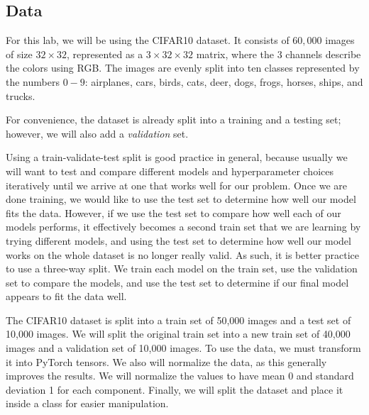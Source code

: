 \subsection*{Data}
For this lab, we will be using the CIFAR10 dataset.
It consists of $60,000$ images of size $32\times32$, represented as a $3\times 32\times 32$ matrix, where the 3 channels describe the colors using RGB.
The images are evenly split into ten classes represented by the numbers $0-9$:  airplanes, cars, birds, cats, deer, dogs, frogs, horses, ships, and trucks.

For convenience, the dataset is already split into a training and a testing set; however, we will also add a \emph{validation} set.

Using a train-validate-test split is good practice in general, because usually we will want to test and compare different models and hyperparameter choices iteratively until we arrive at one that works well for our problem.
Once we are done training, we would like to use the test set to determine how well our model fits the data.
However, if we use the test set to compare how well each of our models performs, it effectively becomes a second train set that we are learning by trying different models, and using the test set to determine how well our model works on the whole dataset is no longer really valid.
As such, it is better practice to use a three-way split.
We train each model on the train set, use the validation set to compare the models, and use the test set to determine if our final model appears to fit the data well.

The CIFAR10 dataset is split into a train set of 50,000 images and a test set of 10,000 images. We will split the original train set into a new train set of 40,000 images and a validation set of 10,000 images.
To use the data, we must transform it into PyTorch tensors.
We also will normalize the data, as this generally improves the results.
We will normalize the values to have mean 0 and standard deviation 1 for each component.
Finally, we will split the dataset and place it inside a  class for easier manipulation.

